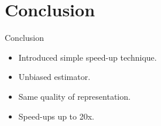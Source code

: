 \documentclass{beamer}
\begin{document}
\section{Conclusion}
\begin{frame}{Conclusion}
\begin{itemize}
\item Introduced simple speed-up technique.
\item Unbiased estimator.
\item Same quality of representation.
\item Speed-ups up to 20x.
\end{itemize}
\end{frame}
\end{document}
